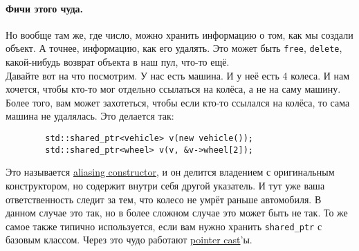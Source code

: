 \documentclass{article}
\begin{document}
    \paragraph{Фичи этого чуда.}
    Но вообще там же, где число, можно хранить информацию о том, как мы создали объект. А точнее, информацию, как его удалять. Это может быть \texttt{free}, \texttt{delete}, какой-нибудь возврат объекта в наш пул, что-то ещё.\\
    Давайте вот на что посмотрим. У нас есть машина. И у неё есть 4 колеса. И нам хочется, чтобы кто-то мог отдельно ссылаться на колёса, а не на саму машину. Более того, вам может захотеться, чтобы если кто-то ссылался на колёса, то сама машина не удалялась. Это делается так:
    \begin{verbatim}
        std::shared_ptr<vehicle> v(new vehicle());
        std::shared_ptr<wheel> v(v, &v->wheel[2]);
    \end{verbatim}
    Это называется \href{https://en.cppreference.com/w/cpp/memory/shared_ptr/shared_ptr}{aliasing constructor}, и он делится владением с оригинальным конструктором, но содержит внутри себя другой указатель. И тут уже ваша ответственность следит за тем, что колесо не умрёт раньше автомобиля. В данном случае это так, но в более сложном случае это может быть не так. То же самое также типично используется, если вам нужно хранить \texttt{shared_ptr} с базовым классом. Через это чудо работают \href{https://en.cppreference.com/w/cpp/memory/shared_ptr/pointer_cast}{pointer cast}'ы.
\end{document}
